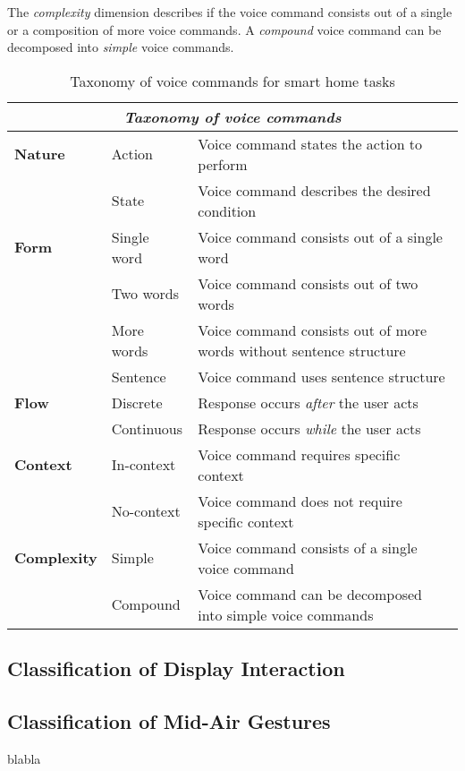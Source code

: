 \documentclass[sigchi]{acmart}
\begin{document}
The \textit{complexity} dimension describes if the voice command consists out of a single or a composition of more voice commands. A \textit{compound} voice command can be decomposed into \textit{simple} voice commands.
\begin{table}[t]
\begin{center}
\caption{Taxonomy of voice commands for smart home tasks}
\label{tab:taxVoice}
\begin{small}
\begin{tabular}{p{} p{} p{}} \toprule
\multicolumn{3}{c}{\textit{Taxonomy of voice commands}} \\ \midrule
\textbf{Nature}		& Action		& Voice command states the action to perform \\
					& State			& Voice command describes the desired condition \\ \midrule
\textbf{Form} 		& Single word	& Voice command consists out of a single word \\
					& Two words		& Voice command consists out of two words \\
					& More words	& Voice command consists out of more words without sentence structure \\
					& Sentence		& Voice command uses sentence structure \\ \midrule
\textbf{Flow}		& Discrete		& Response occurs \textit{after} the user acts \\ 
					& Continuous 	& Response occurs \textit{while} the user acts  \\ \midrule
\textbf{Context}	& In-context	& Voice command requires specific context \\
					& No-context	& Voice command does not require specific context \\ \midrule
\textbf{Complexity}	& Simple		& Voice command consists of a single voice command \\
					& Compound		& Voice command can be decomposed into simple voice commands  \\ \bottomrule
\end{tabular}
\end{small}
\end{center}
\end{table}

\subsection{Classification of Display Interaction}
\subsection{Classification of Mid-Air Gestures}
blabla
\end{document}
